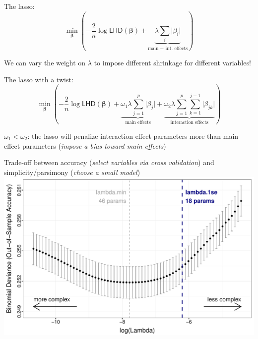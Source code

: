 \documentclass[11pt,xcolor=svgnames]{beamer}
\newcommand{\fg}{\color{ForestGreen}}
\newcommand{\nv}{\color{Navy}}
\newcommand{\bm}[1]{\mathbf{#1}}
\begin{document}
{\begin{frame}
The lasso:
\[ \min_{\bm{\beta}} \left(-\frac{2}{n}\log{\textsf{LHD}(\bm{\beta})} + \underbrace{\lambda \sum_{i} \vert \beta_i \vert}_{\text{main + int. effects}} \right) \]

\vskip 0.25cm \nv 
We can vary the weight on $\lambda$ to impose different shrinkage for different variables!

\end{frame}

\begin{frame}

The lasso with a twist:
\[ \min_{\bm{\beta}} \left(-\frac{2}{n}\log{\textsf{LHD}(\bm{\beta})} + \underbrace{\omega_1 \lambda \sum_{j=1}^{p} \vert \beta_j \vert}_{\text{main effects}} + \underbrace{\omega_2 \lambda \sum_{j=1}^p \sum_{k=1}^{j-1} \vert \beta_{jk} \vert}_{\text{interaction effects}} \right) \]

\vskip 0.5cm 
$\omega_1 < \omega_2$: the lasso will penalize interaction effect parameters more than main effect parameters (\textit{\fg impose a bias toward main effects})

\end{frame}


\begin{frame}
Trade-off between accuracy (\textit{\fg select variables via cross validation}) and simplicity/parsimony (\textit{\fg choose a small model})
\includegraphics[width=\textwidth]{regpath2.pdf}
\end{frame}

}
\end{document}
